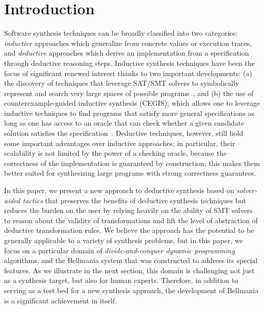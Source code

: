\section{Introduction}
\label{intro}


\newcommand{\xidx}{i}
\newcommand{\yidx}{j}
\newcommand{\xw}[1]{w_{#1}}
\newcommand{\yw}[1]{w'_{#1}}

Software synthesis techniques can be broadly classified into two categories: \emph{inductive} approaches which generalize from concrete values or execution traces, and \emph{deductive} approaches which derive an implementation from a specification through deductive reasoning steps. Inductive synthesis techniques have been the focus of significant renewed interest thanks to two important developments: (a) the discovery of techniques that leverage SAT/SMT solvers to symbolically represent and search very large spaces of possible programs~\cite{APLAS09/Solar-Lezama, PLDI11/Gulwani, Onward13/Torlak}, and (b) the use of counterexample-guided inductive synthesis (CEGIS), which allows one to leverage inductive techniques to find programs that satisfy more general specifications as long as one has access to an oracle that can check whether a given candidate solution satisfies the specification~\cite{APLAS09/Solar-Lezama}. Deductive techniques, however, still hold some important advantages over inductive approaches; in particular, their scalability is not limited by the power of a checking oracle, because the correctness of the implementation is guaranteed by construction; this makes them better suited for synthesizing large programs with strong correctness guarantees. 

In this paper, we present a new approach to deductive synthesis based on \emph{solver-aided tactics} that preserves the benefits of deductive synthesis techniques but reduces the burden on the user by relying heavily on the ability of SMT solvers to reason about the validity of transformations and lift the level of abstraction of deductive transformation rules. 
We believe the approach has the potential to be generally applicable to a variety of synthesis problems, but in this paper, we focus on a particular domain of \emph{divide-and-conquer dynamic programming} algorithms, and the Bellmania system that was constructed to address its special features. As we illustrate in the next section, this domain is challenging not just as a synthesis target, but also for human experts. Therefore, in addition to serving as a test bed for a new synthesis approach, the development of Bellmania is a significant achievement in itself.

